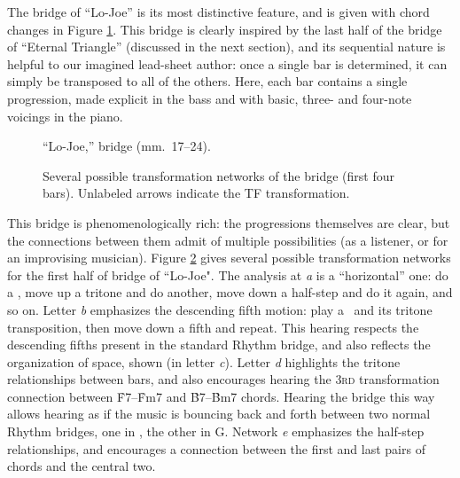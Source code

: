 The bridge of ``Lo-Joe'' is its most distinctive feature, and is given with
chord changes in Figure \ref{lj:bridge}. This bridge is clearly inspired by
the last half of the bridge of ``Eternal Triangle'' (discussed in the next
section), and its sequential nature is helpful to our imagined lead-sheet
author: once a single bar is determined, it can simply be transposed to all of
the others. Here, each bar contains a single \tf progression, made explicit in
the bass and with basic, three- and four-note voicings in the piano.

    \begin{figure}[p]
      \caption{``Lo-Joe,'' bridge (mm.~17--24).}
      \label{lj:bridge}
    \end{figure}

    \begin{figure}[p]
      \caption[Several possible transformation networks of the bridge.]{%
        Several possible transformation networks of the bridge (first four bars).
        Unlabeled arrows indicate the TF transformation.}
      \label{lj:bridge-trans}
    \end{figure}

This bridge is phenomenologically rich: the \tf progressions themselves are
clear, but the connections between them admit of multiple possibilities (as a
listener, or for an improvising musician). Figure \ref{lj:bridge-trans} gives
several possible transformation networks for the first half of bridge of
``Lo-Joe". The analysis at \emph{a} is a ``horizontal'' one: do a \tf, move up
a tritone and do another, move down a half-step and do it again, and so on.
Letter \emph{b} emphasizes the descending fifth motion: play a \tf\ and its
tritone transposition, then move down a fifth and repeat. This hearing
respects the descending fifths present in the standard Rhythm bridge, and also
reflects the organization of \tf space, shown (in letter \emph{c}). Letter
\emph{d} highlights the tritone relationships between bars, and also
encourages hearing the \textsc{3rd} transformation connection between
\h{F7}--\h{Fm7} and \h{B7}--\h{Bm7} chords. Hearing the bridge this way allows
hearing as if the music is bouncing back and forth between two normal Rhythm
bridges, one in \Dflat, the other in G. Network \emph{e} emphasizes the
half-step relationships, and encourages a connection between the first and
last pairs of chords and the central two.

